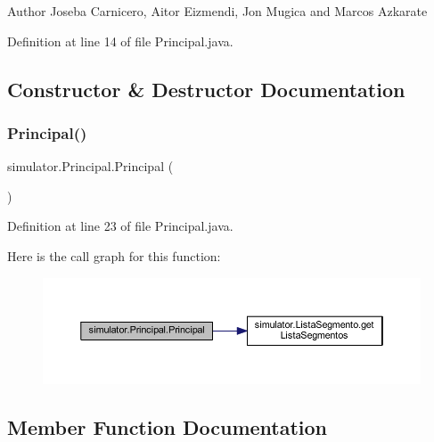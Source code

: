 \begin{DoxyAuthor}{Author}
Joseba Carnicero, Aitor Eizmendi, Jon Mugica and Marcos Azkarate 
\end{DoxyAuthor}


Definition at line 14 of file Principal.\+java.



\subsection{Constructor \& Destructor Documentation}
\mbox{\label{classsimulator_1_1_principal_afbfaa88badb04d25df7d7c0e36067ef8}} 
\subsubsection{\texorpdfstring{Principal()}{Principal()}}
{\footnotesize\ttfamily simulator.\+Principal.\+Principal (\begin{DoxyParamCaption}{ }\end{DoxyParamCaption})}



Definition at line 23 of file Principal.\+java.

Here is the call graph for this function\+:\nopagebreak
\begin{figure}[H]
\begin{center}
\leavevmode
\includegraphics[width=350pt]{classsimulator_1_1_principal_afbfaa88badb04d25df7d7c0e36067ef8_cgraph}
\end{center}
\end{figure}


\subsection{Member Function Documentation}
\mbox{\label{classsimulator_1_1_principal_a472c3314a2ab8e7eff9c2539b7818a22}} 
